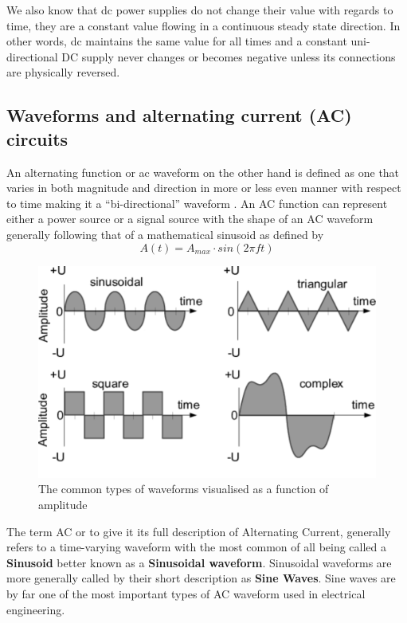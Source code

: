 \documentclass[journal]{IEEEtran}
\begin{document}
We also know that \gls{dc} power supplies do not change their value with regards to time\cite{herman2012direct}, they are a constant value flowing in a continuous steady state direction. In other words, \gls{dc} maintains the same value for all times and a constant uni-directional DC supply never changes or becomes negative unless its connections are physically reversed.


\subsection{Waveforms and alternating current (AC) circuits} \label{ss:power_ac}
An alternating function or \gls{ac} waveform on the other hand is defined as one that varies in both magnitude and direction in more or less even manner with respect to time making it a “bi-directional” waveform \cite{whitaker2006ac}. An AC function can represent either a power source or a signal source with the shape of an AC waveform generally following that of a mathematical sinusoid as defined by
$$A(t) = A_{max} \cdot sin(2 \pi f t)$$

\begin{figure}[ht!]
\centering
\includegraphics[width=1\linewidth,angle=0]{waveforms}
\caption{The common types of waveforms visualised as a function of amplitude}\label{f:waveforms}
\end{figure}

The term AC or to give it its full description of Alternating Current, generally refers to a time-varying waveform with the most common of all being called a \textbf{Sinusoid} better known as a \textbf{Sinusoidal waveform}. Sinusoidal waveforms are more generally called by their short description as \textbf{Sine Waves}. Sine waves are by far one of the most important types of AC waveform used in electrical engineering.
\end{document}
